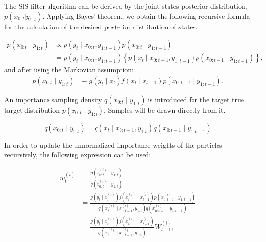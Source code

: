 The SIS filter algorithm can be derived by the joint states posterior distribution, \(p(x_{0:t}|y_{1:t})\). Applying Bayes' theorem, we obtain the following recursive formula for the calculation of the desired posterior distribution of states: 

\begin{equation}
\begin{aligned}
p\left(x_{0: t} \mid y_{1: t}\right) & \propto p\left(y_t \mid x_{0: t}, y_{1: t-1}\right) p\left(x_{0: t} \mid y_{1: t-1}\right) \\
&=p\left(y_t \mid x_{0: t}, y_{1: t-1}\right)\left\{p\left(x_t \mid x_{0: t-1}, y_{1: t-1}\right) p\left(x_{0: t-1} \mid y_{1: t-1}\right)\right\},
\end{aligned}
\end{equation}
\noindent and after using the Markovian assumption:
\begin{equation}
\begin{aligned}
p\left(x_{0: t} \mid y_{1: t}\right)&=g\left(y_t \mid x_t\right) f\left(x_t \mid x_{t-1}\right) p\left(x_{0: t-1} \mid y_{1: t-1}\right).
\end{aligned}
\end{equation}

An importance sampling density \(q(x_{0:t} \mid y_{1:t})\) is introduced for the target true target distribution \(p(x_{0:t} \mid y_{1:t} )\). Samples will be drawn directly from it.

\begin{equation}
    q\left(x_{0: t} \mid y_{1: t}\right)=q\left(x_t \mid x_{0: t-1}, y_{1: t}\right) q\left(x_{0: t-1} \mid y_{1: t-1}\right)
\end{equation}

In order to update the unnormalized importance weights of the particles recursively, the following expression can be used:

\begin{equation}
\begin{aligned}
w_t^{(i)} &=\frac{p\left(x_{0: t}^{(i)} \mid y_{1: t}\right)}{q\left(x_{0: t}^{(i)} \mid y_{1: t}\right)} \\
&=\frac{g\left(y_t \mid x_t^{(i)}\right) f\left(x_t^{(i)} \mid x_{t-1}^{(i)}\right) p\left(x_{0: t-1}^{(i)} \mid y_{1: t-1}\right)}{q\left(x_t^{(i)} \mid x_{0: t-1}^{(i)}, y_{1: t}\right) q\left(x_{0: t-1}^{(i)} \mid y_{1: t-1}\right)} \\
&=\frac{g\left(y_t \mid x_t^{(i)}\right) f\left(x_t^{(i)} \mid x_{t-1}^{(i)}\right)}{q\left(x_t^{(i)} \mid x_{0: t-1}^{(i)}, y_{1: t}\right)} W_{t-1}^{(i)},
\end{aligned}
\label{eq:sis_recursively_weights_update}
\end{equation}

